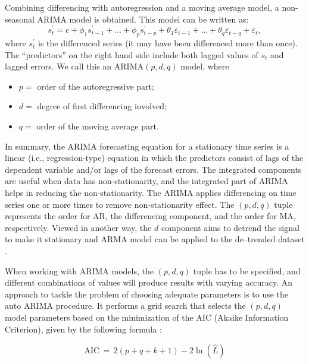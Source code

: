 Combining differencing with autoregression and a moving average model, a non-seasonal ARIMA model is obtained. This model can be written as:
\begin{equation}
    \label{Eq:ARIMApdq}
    s^{'}_{t} = c + \phi_{1} s^{'}_{t-1} + \ldots + \phi_{p} s^{'}_{t-p} + \theta_{1}\varepsilon_{t-1} + \ldots + \theta_{q} \varepsilon_{t-q} + \varepsilon_{t},
\end{equation}
where $s^{'}_{t}$ is the differenced series (it may have been differenced more than once). The ``predictors'' on the right hand side include both lagged values of $s_{t}$ and lagged errors. We call this an ARIMA$(p,d,q)$ model, where
\begin{itemize}
    \item $p =$ order of the autoregressive part;
    \item $d =$ degree of first differencing involved;
    \item $q =$ order of the moving average part. 
\end{itemize}

In summary, the ARIMA forecasting equation for a stationary time series is a linear (i.e., regression-type) equation in which the predictors consist of lags of the dependent variable and/or lags of the forecast errors.  The integrated components are useful when data has non-stationarity, and the integrated part of ARIMA helps in reducing the non-stationarity. The ARIMA applies differencing on time series one or more times to remove non-stationarity effect. The $(p, d, q)$ tuple represents the order for AR, the differencing component, and the order for MA, respectively. Viewed in another way, the $d$ component aims to detrend the signal to make it stationary and ARMA model can be applied to the de--trended dataset \cite{Hyndman2018}.

When working with ARIMA models, the $(p, d, q)$ tuple has to be specified, and different combinations of values will produce results with varying accuracy. An approach to tackle the problem of choosing adequate parameters is to use the auto ARIMA procedure. It performs a grid search that selects the $(p, d, q)$ model parameters based on the minimization of the AIC (Akaike Information Criterion), given by the following formula \cite{Hyndman2008}:

\begin{equation}
\mathrm{AIC} \, = \, 2(p + q+ k + 1) - 2\ln(\hat L)
\end{equation}

